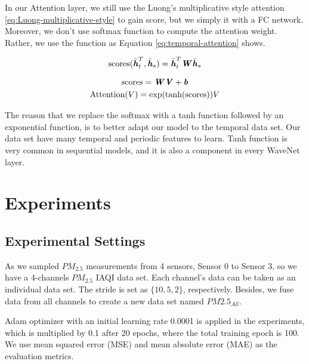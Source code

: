 \documentclass[
twocolumn,
]{ceurart}
\begin{document}
In our Attention layer, we still use the Luong's multiplicative style attention \ref{eq:Luong-multiplicative-style} to gain score, but we simply it with a FC network. Moreover, we don't use softmax function to compute the attention weight. Rather, we use the function as Equation \ref{eq:temporal-attention} shows.

\begin{equation}
    \text{scores}(\bar {\textbf{\textit h}}_t^T,\bar {\textbf{\textit h}}_s)=\bar {\textbf{\textit h}}_t^T\textbf{\textit W}\bar {\textbf{\textit h}}_s 
    \label{eq:Luong-multiplicative-style}
\end{equation}

\begin{gather}
    \text{scores}=\textbf{\textit W}\textbf{\textit V}+\textbf{\textit b} \\
    \text{Attention}(V) = \text{exp}(\text{tanh}(\text{scores}))V
    \label{eq:temporal-attention}
\end{gather}

The reason that we replace the softmax with a tanh function followed by an exponential function, is to better adapt our model to the temporal data set. Our data set have many temporal and periodic features to learn. Tanh function is very common in sequential models, and it is also a component in every WaveNet layer.

\section{Experiments}

\subsection{Experimental Settings}

As we sampled $PM_{2.5}$ measurements from 4 sensors, Sensor 0 to Sensor 3, so we have a 4-channels $PM_{2.5}$ IAQI data set. Each channel's data can be taken as an individual data set. The stride is set as $\{10, 5, 2\}$, respectively. Besides, we fuse data from all channels to create a new data set named $PM2.5_{All}$.

Adam\cite{kingma2017adam} optimizer with an initial learning rate 0.0001 is applied in the experiments, which is multiplied by 0.1 after 20 epochs, where the total training epoch is 100.
We use mean squared error (MSE) and mean absolute error (MAE) as the evaluation metrics.
\end{document}
